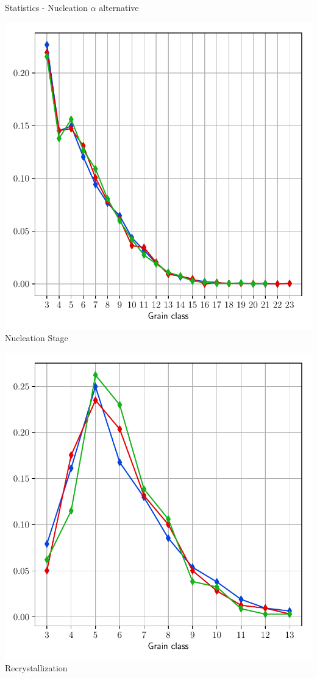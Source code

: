 \documentclass[usenames,dvipsnames]{beamer}
\begin{document}
\begin{frame}{Statistics - Nucleation $\alpha$ alternative}
\small
    \begin{minipage}{0.5\textwidth}
    \centering
    \includegraphics[scale=0.35]{figures/stored_energy/SE/nsides/000110_nuclalternative_set.pdf}\\
    Nucleation Stage
    \end{minipage}%
    \begin{minipage}{0.5\textwidth}
    \centering
    \includegraphics[scale=0.35]{figures/stored_energy/SE/nsides/000240_nuclalternative_set.pdf}\\
    Recrystallization
    \end{minipage}
\end{frame}
\end{document}
